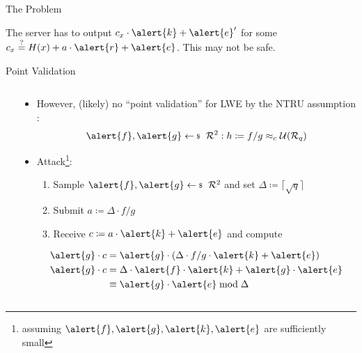 \documentclass[xcolor=table,10pt,aspectratio=169]{beamer}
\providecommand{\ring}[0]{\ensuremath{\mathcal{R}}\xspace}
\providecommand{\ring}[0]{\ensuremath{\mathcal{R}}\xspace}
\begin{document}
\begin{frame}[label={sec:org4d5a5ed}]{The Problem}
\begin{center}
The server has to output \(c_{x} \cdot \alert{k} + \alert{e}'\) for some \(c_x \overset{?}{=}  H(x) + a \cdot \alert{r} + \alert{e}\). This may not be safe.
\end{center}
\end{frame}
\begin{frame}[label={sec:orgdf8f174},fragile]{Point Validation}
\begin{columns}
\begin{column}[t]{0.5\columnwidth}
\newcommand{\mfi}[1]{\fbox{\texttt{[image: \#1]}}}
\setlength{\fboxsep}{0pt}
\end{column}
\begin{column}[t]{0.5\columnwidth}
\pause
\pause

\begin{itemize}
\item However, (likely) no ``point validation'' for LWE by the NTRU assumption \cite{NTRU:HPS98}:
\[
  \alert{f}, \alert{g} \sample \ring^{2}: h \coloneqq f/g \approx_{c} \mathcal{U}(\ring_q)
  \]
\item Attack\footnote{assuming \(\alert{f},\alert{g},\alert{k},\alert{e}\) are sufficiently small}:
\begin{enumerate}
\item Sample \(\alert{f},\alert{g} \sample \ring^{2}\) and set \(\Delta \coloneqq  \lceil \sqrt{q} \rceil\)
\item Submit \(a \coloneqq \Delta \cdot f/g\)
\item Receive \(c \coloneqq a \cdot \alert{k} + \alert{e}\) and compute
\end{enumerate}
\begin{align*}
  \alert{g} \cdot c & = \alert{g} \cdot (\Delta \cdot f/g \cdot \alert{k} + \alert{e})\\
  \alert{g} \cdot c & = \Delta \cdot \alert{f} \cdot \alert{k} + \alert{g} \cdot \alert{e}\\
        &\equiv \alert{g} \cdot \alert{e} \bmod \Delta
\end{align*}
\end{itemize}
\end{column}
\end{columns}
\end{frame}
\end{document}
